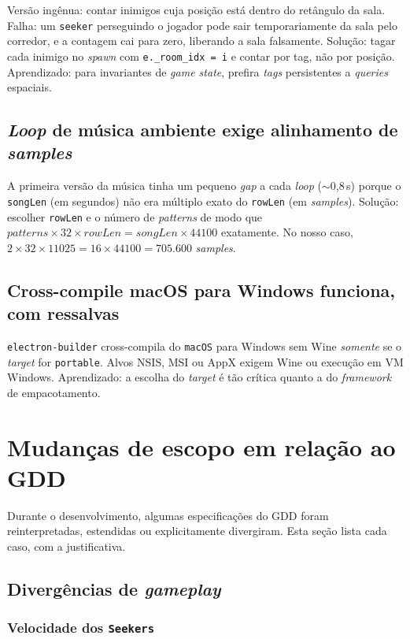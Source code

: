 Versão ingênua: contar inimigos cuja posição está dentro do retângulo da sala.
Falha: um \texttt{seeker} perseguindo o jogador pode sair temporariamente da sala
pelo corredor, e a contagem cai para zero, liberando a sala falsamente. Solução:
tagar cada inimigo no \emph{spawn} com \texttt{e.\_room\_idx = i} e contar por
tag, não por posição. Aprendizado: para invariantes de \emph{game state},
prefira \emph{tags} persistentes a \emph{queries} espaciais.

\subsection{\emph{Loop} de música ambiente exige alinhamento de \emph{samples}}

A primeira versão da música tinha um pequeno \emph{gap} a cada \emph{loop}
($\sim$0,8\,s) porque o \texttt{songLen} (em segundos) não era múltiplo exato do
\texttt{rowLen} (em \emph{samples}). Solução: escolher \texttt{rowLen} e o
número de \emph{patterns} de modo que
$\mathit{patterns} \times 32 \times \mathit{rowLen} =
\mathit{songLen} \times 44100$ exatamente. No nosso caso,
$2 \times 32 \times 11025 = 16 \times 44100 = 705{.}600$ \emph{samples}.

\subsection{Cross-compile macOS para Windows funciona, com ressalvas}

\texttt{electron-builder} cross-compila do \texttt{macOS} para Windows sem Wine
\emph{somente} se o \emph{target} for \texttt{portable}. Alvos NSIS, MSI ou AppX
exigem Wine ou execução em VM Windows. Aprendizado: a escolha do \emph{target} é
tão crítica quanto a do \emph{framework} de empacotamento.

\section{Mudanças de escopo em relação ao GDD}

Durante o desenvolvimento, algumas especificações do GDD foram reinterpretadas,
estendidas ou explicitamente divergiram. Esta seção lista cada caso, com a
justificativa.

\subsection{Divergências de \emph{gameplay}}

\subsubsection*{Velocidade dos \texttt{Seekers}}

